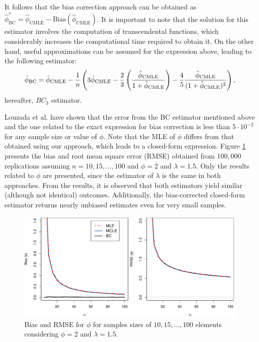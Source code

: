 \documentclass[10pt,a4paper,onecolumn]{article} %
\newcommand{\f}{\on}
\newcommand{\on}{\operatorname}
\begin{document}
It follows that the bias correction approach can be obtained as $\hat{\phi}_{\text{BC}}^* = \hat{\phi}_{\text{CMLE}} - \text{Bias}(\hat{\phi}_{\text{CMLE}})$. It is important to note that the solution for this estimator involves the computation of transcendental functions, which considerably increases the computational time required to obtain it. On the other hand, useful approximations can be assumed for the expression above, leading to the following estimator:
\begin{equation}\label{alpha3}\hat{\phi}_{\f{BC}}=\hat\phi_{\f{CMLE}}-\frac{1}{n}\left(3\hat\phi_{\f{CMLE}}-\frac{2}{3}\left(\frac{\hat\phi_{\f{CMLE}}}{1+\hat\phi_{\f{CMLE}}}\right)-\frac{4}{5}\frac{\hat\phi_{\f{CMLE}}}{(1+\hat\phi_{\f{CMLE}})^2} \right), \vspace{-0.35cm}\end{equation}
hereafter, $BC_3$ estimator.

Louzada et al. \cite{louzada2019note} have shown that the error from the BC estimator mentioned above and the one related to the exact expression for bias correction is less than $5 \cdot 10^{-2}$ for any sample size or value of $\phi$. Note that the MLE of $\phi$ differs from that obtained using our approach, which leads to a closed-form expression. Figure \ref{fg3r} presents the bias and root mean square error (RMSE) obtained from $100,000$ replications assuming $n=10, 15, \ldots, 100$ and $\phi=2$ and $\lambda=1.5$. Only the results related to \(\phi\) are presented, since the estimator of \(\lambda\) is the same in both approaches. From the results, it is observed that both estimators yield similar (although not identical) outcomes. Additionally, the bias-corrected closed-form estimator returns nearly unbiased estimates even for very small samples.
\begin{figure}[!ht]
\centering
\includegraphics[scale=0.55]{biascgamma.pdf}	
\caption{Bias and RMSE for $\phi$ for samples sizes of $10,15,\ldots,100$ elements considering $\phi=2$ and $\lambda=1.5$.}\label{fg3r}
\end{figure}
\end{document}
